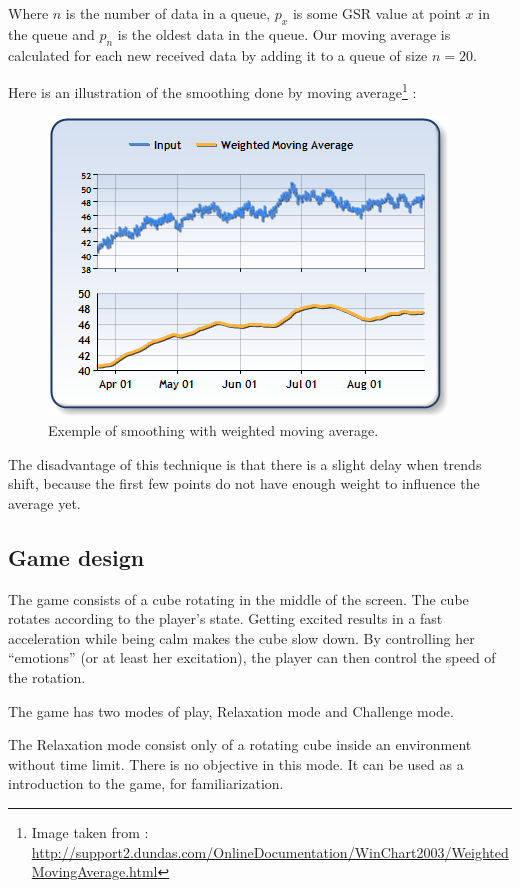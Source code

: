 \documentclass[12pt,a4paper]{article}
\begin{document}
Where $n$ is the number of data in a queue, $p_x$ is some GSR value at point $x$ in the queue and $p_n$ is the oldest data in the queue. Our moving average is calculated for each new received data by adding it to a queue of size $n=20$.

Here is an illustration of the smoothing done by moving average\footnote{Image taken from : \\ \hyperref[]{http://support2.dundas.com/OnlineDocumentation/WinChart2003/WeightedMovingAverage.html}} :

\begin{figure}[H] 
\centering
\includegraphics{WeightedMovingAverage.png}
\caption{Exemple of smoothing with weighted moving average.}
\end{figure}

The disadvantage of this technique is that there is a slight delay when trends shift, because the first few points do not have enough weight to influence the average yet.

\subsection{Game design}

The game consists of a cube rotating in the middle of the screen. The cube rotates according to the player's state. Getting excited results in a fast acceleration while being calm makes the cube slow down. By controlling her ``emotions'' (or at least her excitation), the player can then control the speed of the rotation.

The game has two modes of play, Relaxation mode and Challenge mode. 

The Relaxation mode consist only of a rotating cube inside an environment without time limit. There is no objective in this mode. It can be used as a introduction to the game, for familiarization.
\end{document}
